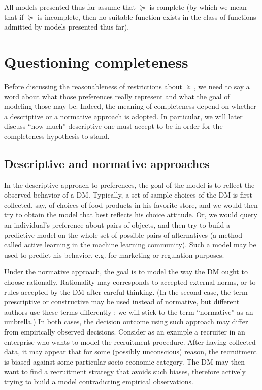 \documentclass[french, english]{llncs}
\begin{document}
All models presented thus far assume that $\succeq$ is complete (by which we mean that if $\succeq$ is incomplete, then no suitable function exists in the class of functions admitted by models presented thus far).
	
\section{Questioning completeness}\label{sec:nordesc}
Before discussing the reasonableness of restrictions about $\succeq$, we need to say a word about what those preferences really represent and what the goal of modeling those may be. Indeed, the meaning of completeness depend on whether a descriptive or a normative approach is adopted. In particular, we will later discuss “how much” descriptive one must accept to be in order for the completeness hypothesis to stand.
	
\subsection{Descriptive and normative approaches}
In the descriptive approach to preferences, the goal of the model is to reflect the observed behavior of a \ac{DM}. Typically, a set of sample choices of the \ac{DM} is first collected, say, of choices of food products in his favorite store, and we would then try to obtain the model that best reflects his choice attitude. Or, we would query an individual’s preference about pairs of objects, and then try to build a predictive model on the whole set of possible pairs of alternatives (a method called active learning in the machine learning community). Such a model may be used to predict his behavior, e.g. for marketing or regulation purposes. 

Under the normative approach, the goal is to model the way the \ac{DM} ought to choose rationally. Rationality may corresponds to accepted external norms, or to rules accepted by the \ac{DM} after careful thinking. (In the second case, the term prescriptive or constructive may be used instead of normative, but different authors use these terms differently \citep{roy_decision_1993, tsoukias_concept_2007}; we will stick to the term “normative” as an umbrella.) In both cases, the decision outcome using such approach may differ from empirically observed decisions. Consider as an example a recruiter in an enterprise who wants to model the recruitment procedure. After having collected data, it may appear that for some (possibly unconscious) reason, the recruitment is biased against some particular socio-economic category. The \ac{DM} may then want to find a recruitment strategy that avoids such biases, therefore actively trying to build a model contradicting empirical observations. 
	
\end{document}
